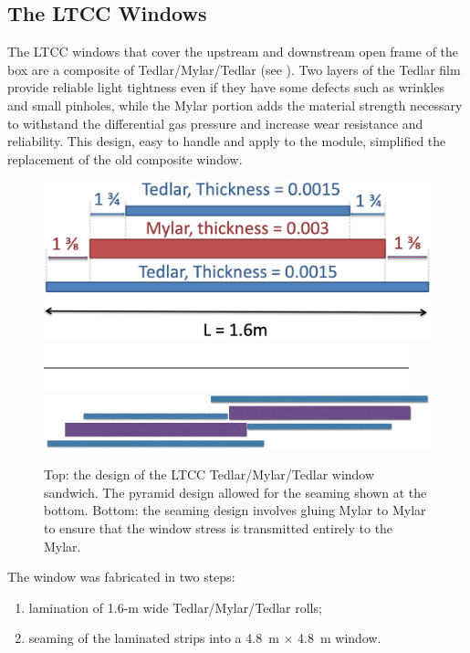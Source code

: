 \subsection{The LTCC Windows}

The LTCC windows that cover the upstream and downstream open frame of the box are a composite of
Tedlar/Mylar/Tedlar (see ). Two layers of the Tedlar film provide reliable light tightness
even if they have some defects such as wrinkles and small pinholes, while the Mylar portion adds the material
strength necessary to withstand the differential gas pressure and increase wear resistance and reliability. This
design, easy to handle and apply to the module, simplified the replacement of the old composite window.

\begin{figure}[!ht]
	\centering
	\includegraphics[width=0.98\columnwidth, keepaspectratio]{img/windowDesign.png}
	\includegraphics[width=0.98\columnwidth, height=0.1\columnwidth]{img/blank.png}
	\includegraphics[width=0.98\columnwidth, keepaspectratio]{img/windowSeaming.png}
	\caption{Top: the design of the LTCC Tedlar/Mylar/Tedlar window sandwich. The pyramid design allowed for the
          seaming shown at the bottom. Bottom: the seaming design involves gluing Mylar to Mylar to ensure that the window
          stress is transmitted entirely to the Mylar.}
	\label{fig:windowDesign}
\end{figure}

The window was fabricated in two steps:

\begin{enumerate}
	\item lamination of 1.6-m wide Tedlar/Mylar/Tedlar rolls;
	\item seaming of the laminated strips into a 4.8~m $\times$ 4.8~m window.
\end{enumerate}


